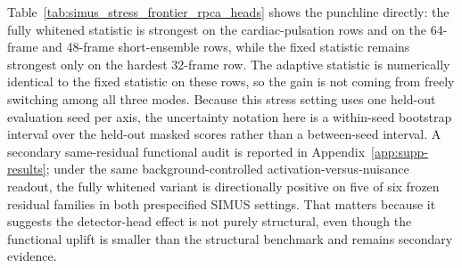 \documentclass[11pt]{article}
\newif\ifPAPERONLY
\newcommand{\SuppOrApp}[1]{\ifPAPERONLY Supplementary Material\else Appendix~\ref{#1}\fi}
\begin{document}
\noindent Table~\ref{tab:simus_stress_frontier_rpca_heads} shows the punchline directly: the fully whitened statistic is strongest on the cardiac-pulsation rows and on the 64-frame and 48-frame short-ensemble rows, while the fixed statistic remains strongest only on the hardest 32-frame row. The adaptive statistic is numerically identical to the fixed statistic on these rows, so the gain is not coming from freely switching among all three modes. Because this stress setting uses one held-out evaluation seed per axis, the uncertainty notation here is a within-seed bootstrap interval over the held-out masked scores rather than a between-seed interval.
\noindent A secondary same-residual functional audit is reported in \SuppOrApp{app:supp-results}; under the same background-controlled activation-versus-nuisance readout, the fully whitened variant is directionally positive on five of six frozen residual families in both prespecified SIMUS settings. That matters because it suggests the detector-head effect is not purely structural, even though the functional uplift is smaller than the structural benchmark and remains secondary evidence.
\end{document}
